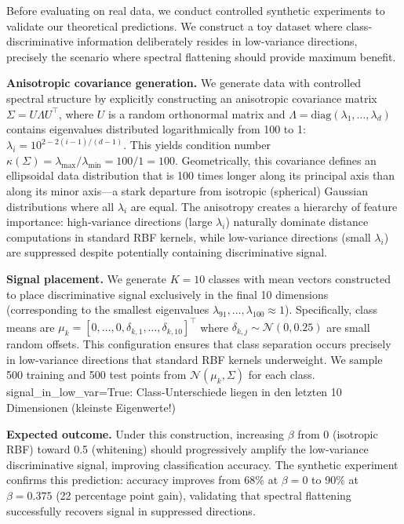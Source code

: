 \documentclass[11pt]{article}
\begin{document}
Before evaluating on real data, we conduct controlled synthetic experiments to validate our theoretical predictions. We construct a toy dataset where class-discriminative information deliberately resides in low-variance directions, precisely the scenario where spectral flattening should provide maximum benefit.

\textbf{Anisotropic covariance generation.} We generate data with controlled spectral structure by explicitly constructing an anisotropic covariance matrix $\Sigma = U \Lambda U^\top$, where $U$ is a random orthonormal matrix and $\Lambda = \text{diag}(\lambda_1, \ldots, \lambda_d)$ contains eigenvalues distributed logarithmically from 100 to 1: $\lambda_i = 10^{2 - 2(i-1)/(d-1)}$. This yields condition number $\kappa(\Sigma) = \lambda_{\max}/\lambda_{\min} = 100/1 = 100$. Geometrically, this covariance defines an ellipsoidal data distribution that is 100 times longer along its principal axis than along its minor axis---a stark departure from isotropic (spherical) Gaussian distributions where all $\lambda_i$ are equal. The anisotropy creates a hierarchy of feature importance: high-variance directions (large $\lambda_i$) naturally dominate distance computations in standard RBF kernels, while low-variance directions (small $\lambda_i$) are suppressed despite potentially containing discriminative signal.

\textbf{Signal placement.} We generate $K=10$ classes with mean vectors constructed to place discriminative signal exclusively in the final 10 dimensions (corresponding to the smallest eigenvalues $\lambda_{91}, \ldots, \lambda_{100} \approx 1$). Specifically, class means are $\mu_k = [0, \ldots, 0, \delta_{k,1}, \ldots, \delta_{k,10}]^\top$ where $\delta_{k,j} \sim \mathcal{N}(0, 0.25)$ are small random offsets. This configuration ensures that class separation occurs precisely in low-variance directions that standard RBF kernels underweight. We sample 500 training and 500 test points from $\mathcal{N}(\mu_k, \Sigma)$ for each class. signal_in_low_var=True: Class-Unterschiede liegen in den letzten 10 Dimensionen (kleinste Eigenwerte!)

\textbf{Expected outcome.} Under this construction, increasing $\beta$ from 0 (isotropic RBF) toward 0.5 (whitening) should progressively amplify the low-variance discriminative signal, improving classification accuracy. The synthetic experiment confirms this prediction: accuracy improves from 68\% at $\beta=0$ to 90\% at $\beta=0.375$ (22 percentage point gain), validating that spectral flattening successfully recovers signal in suppressed directions.
\end{document}
